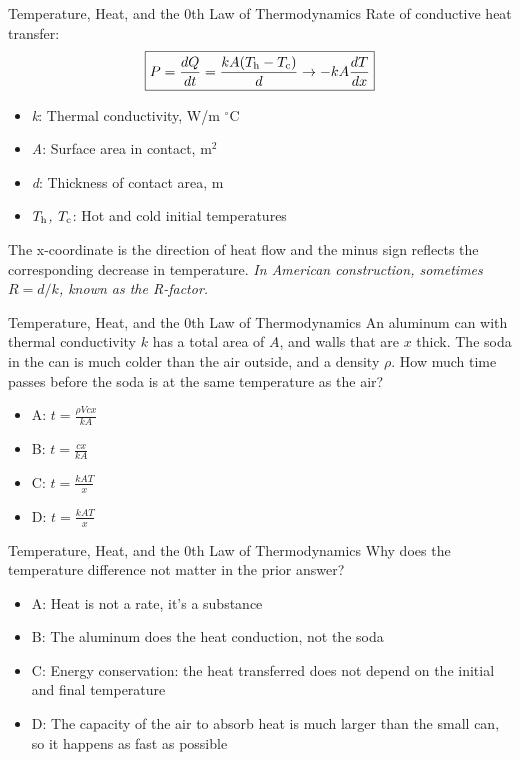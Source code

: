 \documentclass{beamer}
\begin{document}
\begin{frame}{Temperature, Heat, and the 0th Law of Thermodynamics}
\alert{Rate of conductive heat transfer}:
\begin{equation}
\boxed{
P = \frac{dQ}{dt} = \frac{kA(T_{\rm h} - T_{\rm c})}{d} \rightarrow -kA \frac{dT}{dx}}
\end{equation}
\begin{itemize}
\item \textit{k}: Thermal conductivity, W/m $^{\circ}$C
\item \textit{A}: Surface area in contact, m$^2$
\item \textit{d}: Thickness of contact area, m
\item \textit{$T_{\rm h}$, $T_{\rm c}$}: Hot and cold initial temperatures
\end{itemize}
The x-coordinate is the direction of heat flow and the minus sign reflects the corresponding decrease in temperature.  \textit{In American construction, sometimes $R = d/k$, known as the R-factor.}
\end{frame}

\begin{frame}{Temperature, Heat, and the 0th Law of Thermodynamics}
An aluminum can with thermal conductivity $k$ has a total area of $A$, and walls that are $x$ thick.  The soda in the can is much colder than the air outside, and a density $\rho$.  How much time passes before the soda is at the same temperature as the air?
\begin{itemize}
\item A: $t = \frac{\rho Vcx}{kA}$
\item B: $t = \frac{cx}{kA}$
\item C: $t = \frac{kAT}{x}$
\item D: $t = \frac{kAT}{x}$
\end{itemize}
\end{frame}

\begin{frame}{Temperature, Heat, and the 0th Law of Thermodynamics}
Why does the temperature difference not matter in the prior answer?
\begin{itemize}
\item A: Heat is not a rate, it's a substance
\item B: The aluminum does the heat conduction, not the soda
\item C: Energy conservation: the heat transferred does not depend on the initial and final temperature
\item D: The capacity of the air to absorb heat is much larger than the small can, so it happens as fast as possible
\end{itemize}
\end{frame}
\end{document}

